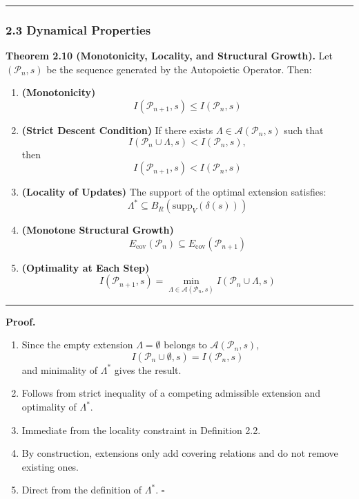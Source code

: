 \documentclass[
]{article}
\begin{document}
\begin{center}\rule{0.5\linewidth}{0.5pt}\end{center}

\subsubsection{2.3 Dynamical Properties}\label{dynamical-properties}

\textbf{Theorem 2.10 (Monotonicity, Locality, and Structural Growth).}
Let \((\mathcal{P}_n, s)\) be the sequence generated by the Autopoietic
Operator. Then:

\begin{enumerate}
\def\labelenumi{\arabic{enumi}.}
\item
  \textbf{(Monotonicity)}
  \[ I(\mathcal{P}_{n+1}, s) \leq I(\mathcal{P}_n, s) \]
\item
  \textbf{(Strict Descent Condition)} If there exists
  \(\Lambda \in \mathcal{A}(\mathcal{P}_n, s)\) such that
  \[ I(\mathcal{P}_n \cup \Lambda, s) < I(\mathcal{P}_n, s), \] then
  \[ I(\mathcal{P}_{n+1}, s) < I(\mathcal{P}_n, s) \]
\item
  \textbf{(Locality of Updates)} The support of the optimal extension
  satisfies: \[ \Lambda^* \subseteq B_R(\mathrm{supp}_V(\delta(s))) \]
\item
  \textbf{(Monotone Structural Growth)}
  \[ E_{\mathrm{cov}}(\mathcal{P}_n) \subseteq E_{\mathrm{cov}}(\mathcal{P}_{n+1}) \]
\item
  \textbf{(Optimality at Each Step)}
  \[ I(\mathcal{P}_{n+1}, s) = \min_{\Lambda \in \mathcal{A}(\mathcal{P}_n, s)} I(\mathcal{P}_n \cup \Lambda, s) \]
\end{enumerate}

\begin{center}\rule{0.5\linewidth}{0.5pt}\end{center}

\textbf{Proof.}

\begin{enumerate}
\def\labelenumi{(\arabic{enumi})}
\item
  Since the empty extension \(\Lambda = \emptyset\) belongs to
  \(\mathcal{A}(\mathcal{P}_n, s)\),
  \[ I(\mathcal{P}_n \cup \emptyset, s) = I(\mathcal{P}_n, s) \] and
  minimality of \(\Lambda^*\) gives the result.
\item
  Follows from strict inequality of a competing admissible extension and
  optimality of \(\Lambda^*\).
\item
  Immediate from the locality constraint in Definition 2.2.
\item
  By construction, extensions only add covering relations and do not
  remove existing ones.
\item
  Direct from the definition of \(\Lambda^*\). \(\square\)
\end{enumerate}
\end{document}
